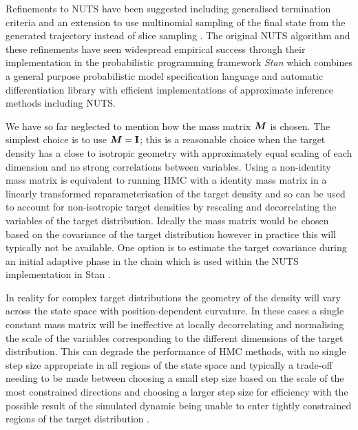 Refinements to \ac{NUTS} have been suggested including generalised termination criteria \citep{betancourt2016identifying,betancourt2013generalizing} and an extension to use multinomial sampling of the final state from the generated trajectory instead of slice sampling \citep{betancourt2016identifying,betancourt2017conceptual}. The original \ac{NUTS} algorithm and these refinements have seen widespread empirical success through their implementation in the probabilistic programming framework \emph{Stan} \citep{carpenter2016stan} which combines a general purpose probabilistic model specification language \citep{stan2017stan} and automatic differentiation library \citep{carpenter2015stan} with efficient implementations of approximate inference methods including \ac{NUTS}.

We have so far neglected to mention how the mass matrix $\boldsymbol{M}$ is chosen. The simplest choice is to use $\boldsymbol{M} = \mathbf{I}$; this is a reasonable choice when the target density has a close to isotropic geometry with approximately equal scaling of each dimension and no strong correlations between variables. Using a non-identity mass matrix is equivalent to running \ac{HMC} with a identity mass matrix in a linearly transformed reparameterisation of the target density \citep{neal2011mcmc} and so can be used to account for non-isotropic target densities by rescaling and decorrelating the variables of the target distribution. Ideally the mass matrix would be chosen based on the covariance of the target distribution \citep{neal2011mcmc,betancourt2017conceptual} however in practice this will typically not be available. One option is to estimate the target covariance during an initial adaptive phase in the chain which is used within the \ac{NUTS} implementation in Stan \cite{carpenter2016stan}.

In reality for complex target distributions the geometry of the density will vary across the state space with position-dependent curvature. In these cases a single constant mass matrix will be ineffective at locally decorrelating and normalising the scale of the variables corresponding to the different dimensions of the target distribution. This can degrade the performance of \ac{HMC} methods, with no single step size appropriate in all regions of the state space and typically a trade-off needing to be made between choosing a small step size based on the scale of the most constrained directions and choosing a larger step size for efficiency with the possible result of the simulated dynamic being unable to enter tightly constrained regions of the target distribution \citep{betancourt2013general}. 

